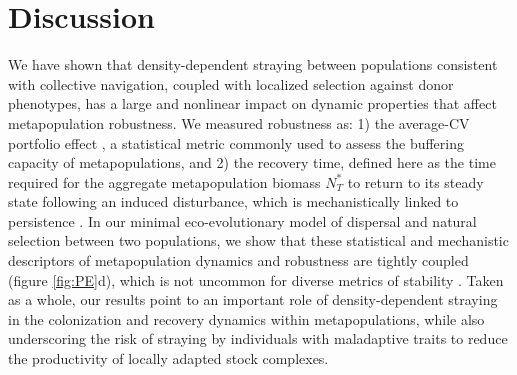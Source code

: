 \documentclass{revtex4}
\begin{document}



\section{Discussion}

We have shown that density-dependent straying between populations consistent with collective navigation, coupled with localized selection against donor phenotypes, has a large and nonlinear impact on dynamic properties that affect metapopulation robustness.
We measured robustness as:
1) the average-CV portfolio effect \citep{Anderson:2013gb,Anonymous:2015gf}, a statistical metric commonly used to assess the buffering capacity of metapopulations, and
2) the recovery time, defined here as the time required for the aggregate metapopulation biomass $N_T^*$ to return to its steady state following an induced disturbance, which is mechanistically linked to persistence \citep{Ovaskainen:2002il}.
In our minimal eco-evolutionary model of dispersal and natural selection between two populations, we show that these statistical and mechanistic descriptors of metapopulation dynamics and robustness are tightly coupled (figure \ref{fig:PE}d), which is not uncommon for diverse metrics of stability \citep{Donohue:2013iu}.
Taken as a whole, our results point to an important role of density-dependent straying in the colonization and recovery dynamics within metapopulations, while also underscoring the risk of straying by individuals with maladaptive traits to reduce the productivity of locally adapted stock complexes.

% 
% 
\end{document}
